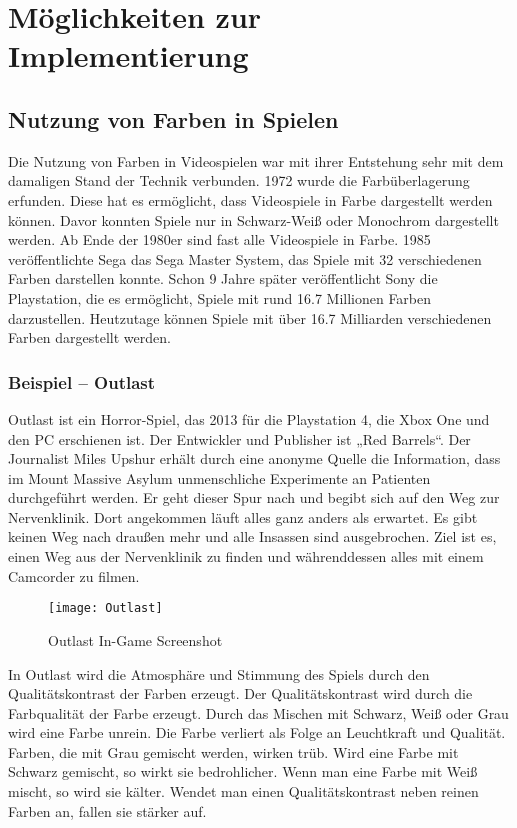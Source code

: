\chapter{Möglichkeiten zur Implementierung}

\section{Nutzung von Farben in Spielen}
Die Nutzung von Farben in Videospielen war mit ihrer Entstehung sehr mit dem damaligen Stand der Technik verbunden. 1972 wurde die Farbüberlagerung erfunden. Diese hat es ermöglicht, dass Videospiele in Farbe dargestellt werden können. Davor konnten Spiele nur in Schwarz-Weiß oder Monochrom dargestellt werden. Ab Ende der 1980er sind fast alle Videospiele in Farbe. 1985 veröffentlichte Sega das Sega Master System, das Spiele mit 32 verschiedenen Farben darstellen konnte. Schon 9 Jahre später veröffentlicht Sony die Playstation, die es ermöglicht, Spiele mit rund 16.7 Millionen Farben darzustellen. Heutzutage können Spiele mit über 16.7 Milliarden verschiedenen Farben dargestellt werden.  
\cite{_the_video_game_explosion}
\cite{_farbkontraste_im_gaming}

\subsection{Beispiel – Outlast}
Outlast ist ein Horror-Spiel, das 2013 für die Playstation 4, die Xbox One und den PC erschienen ist. Der Entwickler und Publisher ist „Red Barrels“. Der Journalist Miles Upshur erhält durch eine anonyme Quelle die Information, dass im Mount Massive Asylum unmenschliche Experimente an Patienten durchgeführt werden. Er geht dieser Spur nach und begibt sich auf den Weg zur Nervenklinik. Dort angekommen läuft alles ganz anders als erwartet. Es gibt keinen Weg nach draußen mehr und alle Insassen sind ausgebrochen. Ziel ist es, einen Weg aus der Nervenklinik zu finden und währenddessen alles mit einem Camcorder zu filmen. 
\cite{_outlast}
\cite{_farbkontraste_im_gaming}

\begin{figure}[H]
	\centering
	\texttt{[image: Outlast]}
	\caption{Outlast In-Game Screenshot\cite{_drawing_basics_and_video_game_art}}
\end{figure}

In Outlast wird die Atmosphäre und Stimmung des Spiels durch den Qualitätskontrast der Farben erzeugt. Der Qualitätskontrast wird durch die Farbqualität der Farbe erzeugt. Durch das Mischen mit Schwarz, Weiß oder Grau wird eine Farbe unrein. Die Farbe verliert als Folge an Leuchtkraft und Qualität. Farben, die mit Grau gemischt werden, wirken trüb. Wird eine Farbe mit Schwarz gemischt, so wirkt sie bedrohlicher. Wenn man eine Farbe mit Weiß mischt, so wird sie kälter. Wendet man einen Qualitätskontrast neben reinen Farben an, fallen sie stärker auf. 
\cite{_farbkontraste}
\cite{_outlast}
\cite{_farbkontraste_im_gaming}

